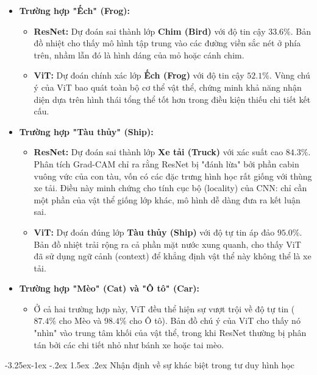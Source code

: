 \documentclass[a4paper]{article}
\makeatletter
\theoremstyle{definition}
\newcounter {subsubsubsection}[subsubsection]
\newcommand\subsubsubsection{\@startsection{subsubsubsection}{4}{\z@}%
                                     {-3.25ex\@plus -1ex \@minus -.2ex}%
                                     {1.5ex \@plus .2ex}%
                                     {\normalfont\normalsize\bfseries}}
\makeatother
\begin{document}
\begin{itemize}
	\item \textbf{Trường hợp "Ếch" (Frog):}
	      \begin{itemize}
		      \item \textbf{ResNet:} Dự đoán sai thành lớp \textbf{Chim (Bird)} với độ tin cậy $33.6\%$. Bản đồ nhiệt cho thấy mô hình tập trung vào các đường viền sắc nét ở phía trên, nhầm lẫn đó là hình dáng của mỏ hoặc cánh chim.
		      \item \textbf{ViT:} Dự đoán chính xác lớp \textbf{Ếch (Frog)} với độ tin cậy $52.1\%$. Vùng chú ý của ViT bao quát toàn bộ cơ thể vật thể, chứng minh khả năng nhận diện dựa trên hình thái tổng thể tốt hơn trong điều kiện thiếu chi tiết kết cấu.
	      \end{itemize}
	\item \textbf{Trường hợp "Tàu thủy" (Ship):}
	      \begin{itemize}
		      \item \textbf{ResNet:} Dự đoán sai thành lớp \textbf{Xe tải (Truck)} với xác suất cao $84.3\%$. Phân tích Grad-CAM chỉ ra rằng ResNet bị "đánh lừa" bởi phần cabin vuông vức của con tàu, vốn có các đặc trưng hình học rất giống với thùng xe tải. Điều này minh chứng cho tính cục bộ (locality) của CNN: chỉ cần một phần của vật thể giống lớp khác, mô hình dễ dàng đưa ra kết luận sai.
		      \item \textbf{ViT:} Dự đoán đúng lớp \textbf{Tàu thủy (Ship)} với độ tự tin áp đảo $95.0\%$. Bản đồ nhiệt trải rộng ra cả phần mặt nước xung quanh, cho thấy ViT đã sử dụng ngữ cảnh (context) để khẳng định vật thể này không thể là xe tải.
	      \end{itemize}
	\item \textbf{Trường hợp "Mèo" (Cat) và "Ô tô" (Car):}
	      \begin{itemize}
		      \item Ở cả hai trường hợp này, ViT đều thể hiện sự vượt trội về độ tự tin ($87.4\%$ cho Mèo và $98.4\%$ cho Ô tô). Bản đồ chú ý của ViT cho thấy nó "nhìn" vào trung tâm khối của vật thể, trong khi ResNet thường bị phân tán bởi các chi tiết nhỏ như bánh xe hoặc tai mèo.
	      \end{itemize}
\end{itemize}

\subsubsubsection{Nhận định về sự khác biệt trong tư duy hình học}
\end{document}
